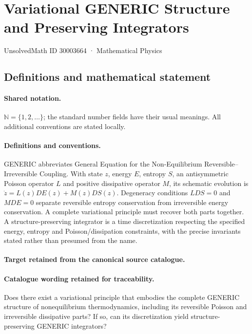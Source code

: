 \documentclass[11pt]{article}
\begin{document}
\setcounter{section}{30003663}
\section{Variational GENERIC Structure and Preserving Integrators}\label{30003664}
{\small UnsolvedMath ID 30003664 · Mathematical Physics}
\subsection{Definitions and mathematical statement}

\paragraph{Shared notation.}$\mathbb N=\{1,2,\ldots\}$; the standard number fields have their usual meanings. All additional conventions are stated locally.


\paragraph{Definitions and conventions.}
GENERIC abbreviates General Equation for the Non-Equilibrium Reversible--Irreversible Coupling. With state $z$, energy $E$, entropy $S$, an antisymmetric Poisson operator $L$ and positive dissipative operator $M$, its schematic evolution is $\dot z=L(z)DE(z)+M(z)DS(z)$. Degeneracy conditions $LDS=0$ and $MDE=0$ separate reversible entropy conservation from irreversible energy conservation. A complete variational principle must recover both parts together. A structure-preserving integrator is a time discretization respecting the specified energy, entropy and Poisson/dissipation constraints, with the precise invariants stated rather than presumed from the name.

\paragraph{Target retained from the canonical source catalogue.}
\paragraph{Catalogue wording retained for traceability.}
Does there exist a variational principle that embodies the complete GENERIC structure of nonequilibrium thermodynamics, including its reversible Poisson and irreversible dissipative parts? If so, can its discretization yield structure-preserving GENERIC integrators?
\end{document}
